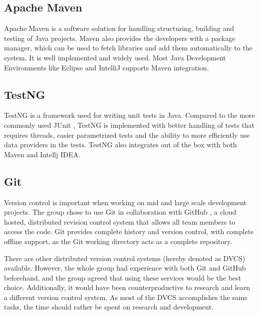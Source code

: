 \subsection{Apache Maven}
\label{subsec:prestudies-tools-apache_maven}

Apache Maven is a software solution for handling structuring, building and testing of Java projects. Maven also provides the developers with a package manager, which can be used to fetch libraries and add them automatically to the system. It is well implemented and widely used. Most Java Development Environments like Eclipse and IntelliJ supports Maven integration.

\subsection{TestNG}
\label{subsec:prestudies-tools-testng}

TestNG \cite{test-ng} is a framework used for writing unit tests in Java. Compared to the more commonly used JUnit \cite{junit}, TestNG is implemented with better handling of tests that requires threads, easier parametrized tests and the ability to more efficiently use data providers in the tests. TestNG also integrates out of the box with both Maven and Intellj IDEA.

\subsection{Git}
\label{subsec:prestudies-tools-git}

Version control is important when working on mid and large scale development projects. The group chose to use Git \cite{git} in collaboration with GitHub \cite{github}, a cloud hosted, distributed revision control system that allows all team members to access the code. Git provides complete history and version control, with complete offline support, as the Git working directory acts as a complete repository.

There are other distributed version control systems (hereby denoted as DVCS) available. However, the whole group had experience with both Git and GitHub beforehand, and the group agreed that using these services would be the best choice. Additionally, it would have been counterproductive to research and learn a different version control system. As most of the DVCS accomplishes the same tasks, the time should rather be spent on research and development.

